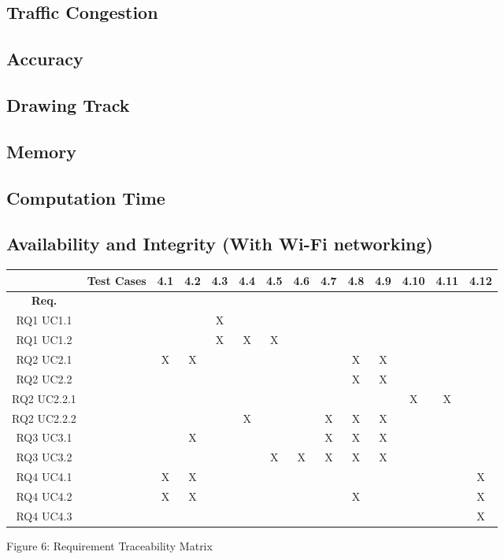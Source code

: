 \documentclass{article}
\begin{document}
			\subsection{Traffic Congestion} %
			\subsection{Accuracy} %
			\subsection{Drawing Track} %
			\subsection{Memory} %
			\subsection{Computation Time} %
			\subsection{Availability and Integrity (With Wi-Fi networking)} %
\begin{flushleft}
\begin{tabular}{|c|c|c|c|c|c|c|c|c|c|c|c|c|c|}

\hline
 & \textbf{Test Cases} & 4.1 & 4.2 & 4.3 & 4.4 & 4.5 & 4.6 & 4.7 & 4.8 & 4.9 & 4.10 & 4.11 & 4.12 \\
\hline
\textbf{Req.} & & & & & & & & & & & & & \\
\hline
RQ1 UC1.1 & & & & X & & & & & & & & & \\
\hline
RQ1 UC1.2 & & & & X & X & X & & & & & & & \\
\hline
RQ2 UC2.1 &  & X & X & & & & &  & X & X & & & \\
\hline
RQ2 UC2.2 & & & & & & & & & X & X & & & \\
\hline
RQ2 UC2.2.1 & & & & & & & & & & & X & X & \\
\hline
RQ2 UC2.2.2 & & & & & X & & & X & X & X & & & \\
\hline
RQ3 UC3.1 & & & X & & & & & X & X & X & & & \\
\hline
RQ3 UC3.2 & & & & & & X & X & X & X & X & & & \\
\hline
RQ4 UC4.1 & & X & X & & & & & & & & & & X \\
\hline
RQ4 UC4.2 & & X & X & & & & & & X & & & & X \\
\hline
RQ4 UC4.3 & & & & & & & & & & & & & X \\
\hline
\end{tabular}
Figure 6: Requirement Traceability Matrix
\end{flushleft}	
\end{document}
